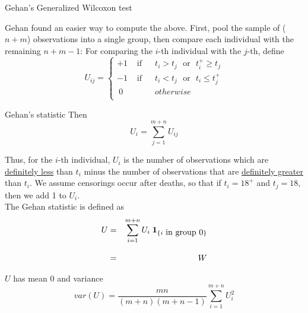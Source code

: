 \documentclass[envcountsect, 10pt, portrait, palatino]{beamer}
\begin{document}
\begin{frame}{Gehan's Generalized Wilcoxon test}

Gehan found an easier way to compute the above.  First, pool
the sample of ($n+m$) observations into a single group, then
compare each individual with the remaining $n+m-1$:  For
comparing the $i$-th individual with the $j$-th, define
\[ U_{ij}=\left\{\begin{array}{ccc}
+1 & \mbox{ if } & ~~t_i>t_j \mbox{~~or~~} t_i^+\geq t_j\\
-1 & \mbox{ if } & ~~t_i<t_j \mbox{~~or~~} t_i \leq t_j^+\\
~0 &             & ~~otherwise\\
\end{array} \right. \]
\end{frame}
\begin{frame}{Gehan's statistic}
Then
$$U_i=\sum_{j=1}^{m+n} U_{ij}$$

Thus, for the $i$-th individual, $U_i$ is the number of
observations which are \underline{definitely less} than $t_i$
minus the number of observations that are \underline{definitely
greater} than $t_i$.  We assume censorings occur after deaths,
so that if $t_i=18^+$ and $t_j=18$, then we add 1 to $U_i$.
\\[2ex]
The Gehan statistic is defined as
\begin{eqnarray*}
U & = & \sum_{i=1}^{m+n} U_i \; {\bf 1}_{\{i \mbox{ in group 0}\}}\\[2ex]
  & = & W
\end{eqnarray*}

$U$ has mean 0 and variance
\[var(U) = \frac{mn}{(m+n)(m+n-1)}\sum_{i=1}^{m+n} U_i^2\]
\end{frame}
\end{document}
